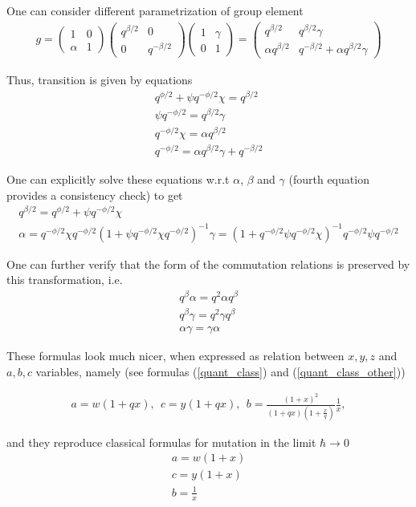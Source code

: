 \documentclass{paper}
\def\be{\begin{eqnarray}}
\def\ee{\end{eqnarray}}
\def\me{\mathcal{E}}
\def\dg{\Delta \lb g \rb}
\def\lb{\left (}
\def\rb{\right )}
\def\gog{g \otimes g}
\def\classlim{\hbar \rightarrow 0}
\newcommand{\matd}[4]{\lb \begin{array}{cc}
#1 & #2 \\ #3 & #4
\end{array} \rb}
\newcommand{\delabel}[1]{(\ref{#1})}
\newcommand{\Eoned}[1]{\lb \begin{array}{cc}
1 & #1 \\ 0 & 1
\end{array} \rb}
\newcommand{\Foned}[1]{\lb \begin{array}{cc}
1 & 0 \\ #1 & 1
\end{array} \rb}
\begin{document}
One can consider different parametrization of group element
\be
g = \Foned{\alpha} \matd{q^{\beta/2}}{0}{0}{q^{-\beta/2}} \Eoned{\gamma} = \matd{q^{\beta/2} }{q^{\beta/2}\gamma}{\alpha q^{\beta/2}}{q^{-\beta/2} + \alpha q^{\beta/2}\gamma} \label{g_quantd_2}
\ee

Thus, transition is given by equations
\be
q^{\phi/2} + \psi q^{-\phi/2} \chi = q^{\beta/2} \\
\psi q^{-\phi/2} = q^{\beta/2} \gamma \\
q^{-\phi/2} \chi = \alpha q^{\beta/2} \\
q^{-\phi/2} = \alpha q^{\beta/2} \gamma + q^{-\beta/2}
\ee

One can explicitly solve these equations w.r.t $\alpha$, $\beta$ and $\gamma$
(fourth equation provides a consistency check) to get
\be
q^{\beta/2} = q^{\phi/2} + \psi q^{-\phi/2} \chi \\
\alpha = q^{-\phi/2} \chi q^{-\phi/2} \lb 1 + \psi q^{-\phi/2} \chi q^{-\phi/2} \rb^{-1}
\gamma = \lb 1 + q^{-\phi/2} \psi q^{-\phi/2} \chi \rb^{-1} q^{-\phi/2} \psi q^{-\phi/2}
\ee

One can further verify that the form of the commutation relations is preserved by this transformation, i.e.
\be
q^{\beta} \alpha = q^2 \alpha q^{\beta} \\
q^{\beta} \gamma = q^2 \gamma q^{\beta} \\
\alpha \gamma = \gamma \alpha
\ee

These formulas look much nicer, when expressed as relation between $x, y, z$ and $a, b, c$
variables, namely (see formulas \delabel{quant_class} and \delabel{quant_class_other})

\be
\boxed{
  a = w (1 + q x),\ \ c = y(1 + q x), \ \ b = \frac{\lb 1 + x\rb^2}{\lb 1 + q x\rb\lb 1 + \frac{x}{q}\rb} \frac{1}{x},
}
\ee

and they reproduce classical formulas for mutation in the limit $\classlim$
\be
a = w \lb 1 + x\rb \\
c = y \lb 1 + x\rb \\
b = \frac{1}{x}
\ee




\end{document}
